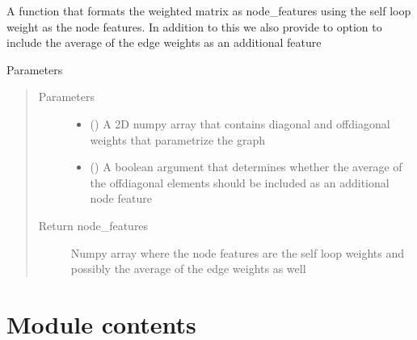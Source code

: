 \documentclass[letterpaper,10pt,english]{sphinxmanual}
\begin{document}
\begin{fulllineitems}
\begin{fulllineitems}
\label{\detokenize{modules/gqcml.data:gqcml.data.Data.Preprocessor.weights_nf}}
A function that formats the weighted matrix as node\_features using the self loop weight
as the node features. In addition to this we also provide to option to include the average
of the edge weights as an additional feature

Parameters
\begin{quote}\begin{description}
\item[{Parameters}] \leavevmode\begin{itemize}
\item {} 
\sphinxstyleliteralstrong{\sphinxupquote{(}}\sphinxstyleliteralstrong{\sphinxupquote{)}} () \textendash{} A 2D numpy array that contains diagonal and off\sphinxhyphen{}diagonal weights
that parametrize the graph

\item {} 
 (\sphinxstyleliteralemphasis{\sphinxupquote{(}}\sphinxstyleliteralemphasis{\sphinxupquote{)}}) \textendash{} A boolean argument that determines whether the average of the off\sphinxhyphen{}diagonal
elements should be included as an additional node feature

\end{itemize}

\item[{Return node\_features}] \leavevmode
Numpy array where the node features are the self loop
weights and possibly the average of the edge weights as well

\end{description}\end{quote}

\end{fulllineitems}


\end{fulllineitems}



\section{Module contents}
\label{\detokenize{modules/gqcml.data:module-gqcml.data}}\label{\detokenize{modules/gqcml.data:module-contents}}
\end{document}
